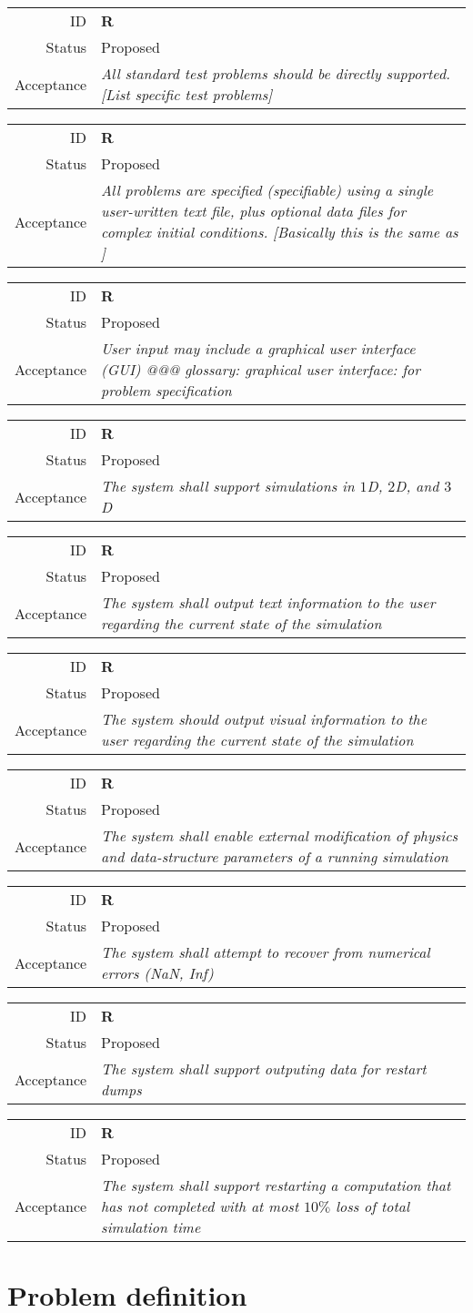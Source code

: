 \documentclass{book}
\newcommand{\req}[3]{
\begin{tabular}{rl}
ID & \textbf{R#1} \\
Status & \textsf{#2} \\
Acceptance & \textit{#3}
\end{tabular}
}
\begin{document}
\req
  {}
  {Proposed}
%
  {All standard test problems should be directly supported.  [List
  specific test problems]}

\req
  {}
  {Proposed}
%
  {All problems are specified (specifiable) using a single user-written
   text file, plus optional data files for complex initial conditions. 
   [Basically this is the same as \enzo] }

\req
  {}
  {Proposed}
%
  {User input may include a graphical user interface (GUI) @@@
  glossary: graphical user interface: for problem specification}

\req
  {}
  {Proposed}
%
  {The system shall support simulations in $1$D, $2$D, and $3$D}

\req
  {}
  {Proposed}
%
  {The system shall output text information to the user regarding the
  current state of the simulation}

\req
  {}
  {Proposed}
%
  {The system should output visual information to the user regarding
  the current state of the simulation}

\req
  {}
  {Proposed}
%
  {The system shall enable external modification of physics and
  data-structure parameters of a running simulation}

\req
  {}
  {Proposed}
  {The system shall attempt to recover from numerical errors (NaN, Inf)}

\req
  {} {Proposed}
%
  {The system shall support outputing data for restart dumps}

\req
  {} {Proposed}
%
  {The system shall support restarting a computation that has not
  completed with at most $10\%$ loss of total simulation time}

\section{Problem definition}
\end{document}
